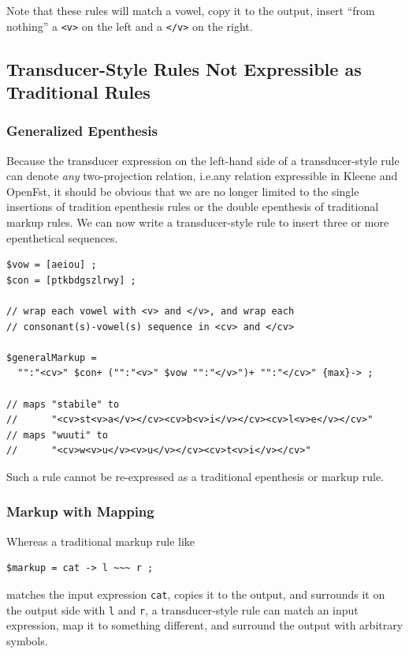 \noindent
Note that these rules will match a vowel, copy it to the output, insert ``from nothing'' a \verb!<v>!
on the left and a \verb!</v>! on the right.


\subsection{Transducer-Style Rules Not Expressible as Traditional Rules}

\subsubsection{Generalized Epenthesis}

Because the transducer expression on the left-hand side of a transducer-style rule can denote
\emph{any} two-projection relation, i.e.\@ any relation expressible in Kleene and OpenFst, 
it should be obvious that we are no longer limited to the single insertions of tradition
epenthesis rules or the double epenthesis of traditional
markup rules.  We can now write a transducer-style rule to insert three or more epenthetical sequences.

\begin{Verbatim}
$vow = [aeiou] ;
$con = [ptkbdgszlrwy] ;

// wrap each vowel with <v> and </v>, and wrap each 
// consonant(s)-vowel(s) sequence in <cv> and </cv>

$generalMarkup = 
  "":"<cv>" $con+ ("":"<v>" $vow "":"</v>")+ "":"</cv>" {max}-> ;

// maps "stabile" to 
//      "<cv>st<v>a</v></cv><cv>b<v>i</v></cv><cv>l<v>e</v></cv>"
// maps "wuuti" to 
//      "<cv>w<v>u</v><v>u</v></cv><cv>t<v>i</v></cv>"
\end{Verbatim}

\noindent
Such a rule cannot be re-expressed as a traditional epenthesis or markup rule.

\subsubsection{Markup with Mapping}

Whereas a traditional markup rule like

\begin{Verbatim}
$markup = cat -> l ~~~ r ;
\end{Verbatim}

\noindent
matches the input expression \verb!cat!, copies it to the output, and surrounds it on the output side with \verb!l! and \verb!r!, a
transducer-style rule can match an input expression, map it to something different, and
surround the output with arbitrary symbols.

